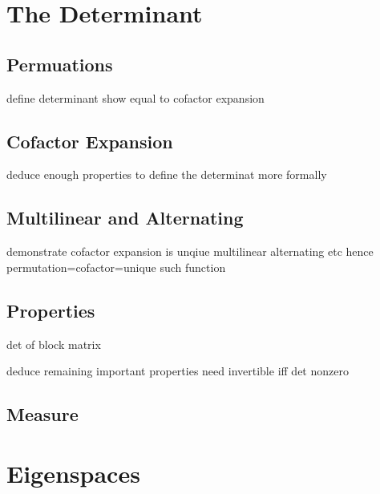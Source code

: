 \documentclass[oneside, 12pt]{book}
\theoremstyle{definition}
\begin{document}
\chapter{The Determinant}
\section{Permuations}
define determinant
show equal to cofactor expansion
\section{Cofactor Expansion}
deduce enough properties to define the determinat more formally
\section{Multilinear and Alternating}
demonstrate cofactor expansion is unqiue multilinear alternating etc
hence permutation=cofactor=unique such function
\section{Properties}
det of block matrix

deduce remaining important properties
need invertible iff det nonzero
\section{Measure}
\chapter{Eigenspaces}
\end{document}
